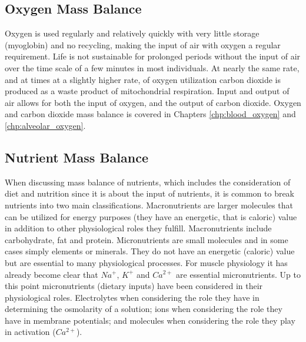 \subsection{Oxygen Mass Balance}
Oxygen is used regularly and relatively quickly with very little storage (myoglobin) and no recycling, making the input of air with oxygen a regular requirement. Life is not sustainable for prolonged periods without the input of air over the time scale of a few minutes in most individuals. At nearly the same rate, and at times at a slightly higher rate, of oxygen utilization carbon dioxide is produced as a waste product of mitochondrial respiration. Input and output of air allows for both the input of oxygen, and the output of carbon dioxide. Oxygen and carbon dioxide mass balance is covered in Chapters \ref{chp:blood_oxygen} and \ref{chp:alveolar_oxygen}.

\subsection{Nutrient Mass Balance}

When discussing mass balance of nutrients, which includes the consideration of diet and nutrition since it is about the input of nutrients, it is common to break nutrients into two main classifications. Macronutrients are larger molecules that can be utilized for energy purposes (they have an energetic, that is caloric) value in addition to other physiological roles they fulfill. Macronutrients include carbohydrate, fat and protein. Micronutrients are small molecules and in some cases simply elements or minerals. They do not have an energetic (caloric) value but are essential to many physiological processes. For muscle physiology it has already become clear that $Na^+$, $K^+$ and $Ca^{2+}$ are essential micronutrients. Up to this point micronutrients (dietary inputs) have been considered in their physiological roles. Electrolytes when considering the role they have in determining the osmolarity of a solution; ions when considering the role they have in membrane potentials; and molecules when considering the role they play in activation ($Ca^{2+}$).

